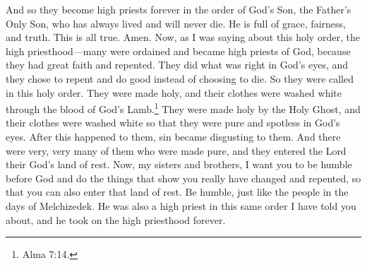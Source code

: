 And so they become high priests forever in the order of God's Son, the Father's Only Son, who has always lived and will never die. He is full of grace, fairness, and truth. This is all true. Amen.
\bverse \iffalse Now, as I said concerning the holy order, or this high priesthood, there were many who were ordained and became high priests of God; and it was on account of their exceeding faith and repentance, and their righteousness before God, they choosing to repent and work righteousness rather than to perish; \fi
Now, as I was saying about this holy order, the high priesthood---many were ordained and became high priests of God, because they had great faith and repented. They did what was right in God's eyes, and they chose to repent and do good instead of choosing to die.
\bverse \iffalse Therefore they were called after this holy order, and were sanctified, and their garments were washed white through the blood of the Lamb. \fi
So they were called in this holy order. They were made holy, and their clothes were washed white through the blood of God's Lamb.\footnote{Alma 7:14.}
\bverse \iffalse Now they, after being sanctified by the Holy Ghost, having their garments made white, being pure and spotless before God, could not look upon sin save it were with abhorrence; and there were many, exceedingly great many, who were made pure and entered into the rest of the Lord their God. \fi
They were made holy by the Holy Ghost, and their clothes were washed white so that they were pure and spotless in God's eyes. After this happened to them, sin became disgusting to them. And there were very, very many of them who were made pure, and they entered the Lord their God's land of rest.
\bverse \iffalse And now, my brethren, I would that ye should humble yourselves before God, and bring forth fruit meet for repentance, that ye may also enter into that rest. \fi
Now, my sisters and brothers, I want you to be humble before God and do the things that show you really have changed and repented, so that you can also enter that land of rest.
\bverse \iffalse Yea, humble yourselves even as the people in the days of Melchizedek, who was also a high priest after this same order which I have spoken, who also took upon him the high priesthood forever. \fi
Be humble, just like the people in the days of Melchizedek. He was also a high priest in this same order I have told you about, and he took on the high priesthood forever.
\bverse \iffalse And it was this same Melchizedek to whom Abraham paid tithes; yea, even our father Abraham paid tithes of one-tenth part of all he possessed. \fi
